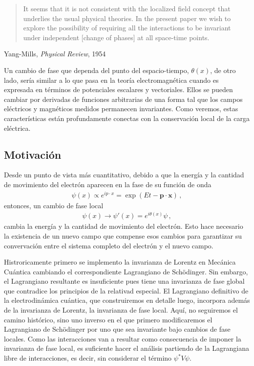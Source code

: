 \begin{subappendices}
\begin{quote}
It seems that it is not consistent with the localized field concept that underlies the usual physical theories. In the present paper we wish to explore the possibility of requiring all the interactions to be invariant under independent [change of phases] at all space-time points.
  \end{quote}
  \begin{flushright}
    Yang-Mills, \emph{Physical Review}, 1954
  \end{flushright}

Un cambio de fase que dependa del punto del espacio-tiempo, $\theta(x)$, de otro lado, sería similar a lo que pasa en la teoría electromagnética cuando es expresada en términos de potenciales escalares y vectoriales. Ellos se pueden cambiar por derivadas de funciones arbitrarias de una forma tal que los campos eléctricos y magnéticos medidos permanecen invariantes. Como veremos, estas características están profundamente conectas con la conservación local de la carga eléctrica.  

\subsection{Motivación}

Desde un punto de vista más cuantitativo, debido a que la energía y la cantidad de movimiento del electrón aparecen  en la fase de su función de onda
\begin{align}
  \psi(x)\propto e^{i p\cdot x}=\exp(Et-\mathbf{p}\cdot \mathbf{x})\,,
\end{align}
entonces, un cambio de fase local
\begin{align}
 \psi(x)\to \psi'(x)=e^{{i\theta(x)}}\psi\,,
\end{align}
cambia la energía y la cantidad de movimiento del electrón. Esto hace necesario la existencia de un nuevo campo que compense esos cambios para garantizar su convervación entre el sistema completo del electrón y el nuevo campo.

Histroricamente primero se implemento la invarianza de Lorentz en Mecánica Cuántica cambiando el correspondiente Lagrangiano de Sch\"odinger. Sin embargo, el Lagrangiano resultante es insuficiente pues tiene una invarianza de fase global que contradice los principios de la relativad especial. El Lagrangiano definitivo de la electrodinámica cuántica, que construiremos en detalle luego, incorpora además de la invarianza de Lorentz, la invarianza de fase local. Aquí, no seguiremos el camino histórico, sino uno inverso en el  que primero modificaremos el Lagrangiano de Sch\"odinger por uno que sea invariante bajo cambios de fase locales. Como las interacciones van a resultar como consecuencia de imponer la invarianza de fase local, es suficiente hacer el análisis partiendo de la Lagrangiana libre de interacciones, es decir, sin considerar el término $\psi^{*}V\psi$.


\end{subappendices}
